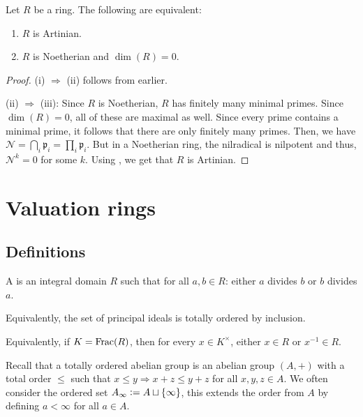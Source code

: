 \documentclass[12pt]{article}
\begin{document}
\begin{cor} \label{cor:artinian-noetherian-dimension-zero}
	Let $R$ be a ring. The following are equivalent:
	\begin{enumerate}[label=(\roman*)]
		\item $R$ is Artinian.
		\item $R$ is Noetherian and $\dim(R) = 0$.
	\end{enumerate}
\end{cor}
\begin{proof} 
	(i) $\Rightarrow$ (ii) follows from earlier.

	(ii) $\Rightarrow$ (iii): Since $R$ is Noetherian, $R$ has finitely many minimal primes. Since $\dim(R) = 0$, all of these are maximal as well. Since every prime contains a minimal prime, it follows that there are only finitely many primes. Then, we have $\mathcal{N} = \bigcap_{i} \mathfrak{p}_{i} = \prod_{i} \mathfrak{p}_{i}$. But in a Noetherian ring, the nilradical is nilpotent and thus, $\mathcal{N}^{k} = 0$ for some $k$. Using , we get that $R$ is Artinian.
\end{proof}

\section{Valuation rings}

\subsection{Definitions}

\begin{defn}
	A  is an integral domain $R$ such that for all $a, b \in R$: either $a$ divides $b$ or $b$ divides $a$.

	Equivalently, the set of principal ideals is totally ordered by inclusion.

	Equivalently, if $K = \operatorname{Frac}(R)$, then for every $x \in K^{\times}$, either $x \in R$ or $x^{-1} \in R$.
\end{defn}

Recall that a totally ordered abelian group is an abelian group $(A, +)$ with a total order $\le$ such that $x \le y \Rightarrow x + z \le y + z$ for all $x, y, z \in A$. \newline
We often consider the ordered set $A_{\infty} \vcentcolon= A \sqcup \{\infty\}$, this extends the order from $A$ by defining $a < \infty$ for all $a \in A$.
\end{document}
